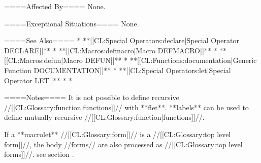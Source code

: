 ====Affected By====
None.

====Exceptional Situations====
None.

====See Also====
  * **[[CL:Special Operators:declare|Special Operator DECLARE]]**
  * **[[CL:Macros:defmacro|Macro DEFMACRO]]**
  * **[[CL:Macros:defun|Macro DEFUN]]**
  * **[[CL:Functions:documentation|Generic Function DOCUMENTATION]]**
  * **[[CL:Special Operators:let|Special Operator LET]]**
  * {\secref\Evaluation}
  * {\secref\DocVsDecls}

====Notes====
It is not possible to define recursive //[[CL:Glossary:function|functions]]// with **flet**. **labels** can be used to define mutually recursive //[[CL:Glossary:function|functions]]//.

If a **macrolet** //[[CL:Glossary:form]]// is a //[[CL:Glossary:top level form]]//, the body //forms// are also processed as //[[CL:Glossary:top level forms]]//. see section {\secref\FileCompilation}.

                
